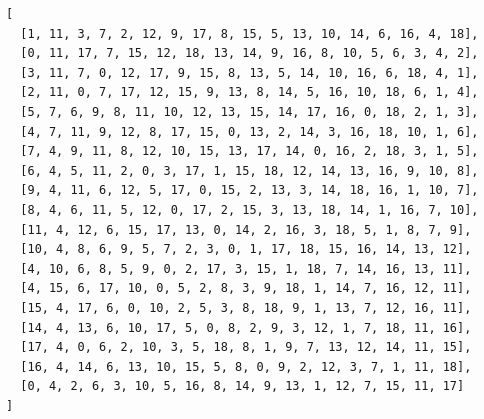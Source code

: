 \begin{verbatim}
[
  [1, 11, 3, 7, 2, 12, 9, 17, 8, 15, 5, 13, 10, 14, 6, 16, 4, 18],
  [0, 11, 17, 7, 15, 12, 18, 13, 14, 9, 16, 8, 10, 5, 6, 3, 4, 2],
  [3, 11, 7, 0, 12, 17, 9, 15, 8, 13, 5, 14, 10, 16, 6, 18, 4, 1],
  [2, 11, 0, 7, 17, 12, 15, 9, 13, 8, 14, 5, 16, 10, 18, 6, 1, 4],
  [5, 7, 6, 9, 8, 11, 10, 12, 13, 15, 14, 17, 16, 0, 18, 2, 1, 3],
  [4, 7, 11, 9, 12, 8, 17, 15, 0, 13, 2, 14, 3, 16, 18, 10, 1, 6],
  [7, 4, 9, 11, 8, 12, 10, 15, 13, 17, 14, 0, 16, 2, 18, 3, 1, 5],
  [6, 4, 5, 11, 2, 0, 3, 17, 1, 15, 18, 12, 14, 13, 16, 9, 10, 8],
  [9, 4, 11, 6, 12, 5, 17, 0, 15, 2, 13, 3, 14, 18, 16, 1, 10, 7],
  [8, 4, 6, 11, 5, 12, 0, 17, 2, 15, 3, 13, 18, 14, 1, 16, 7, 10],
  [11, 4, 12, 6, 15, 17, 13, 0, 14, 2, 16, 3, 18, 5, 1, 8, 7, 9],
  [10, 4, 8, 6, 9, 5, 7, 2, 3, 0, 1, 17, 18, 15, 16, 14, 13, 12],
  [4, 10, 6, 8, 5, 9, 0, 2, 17, 3, 15, 1, 18, 7, 14, 16, 13, 11],
  [4, 15, 6, 17, 10, 0, 5, 2, 8, 3, 9, 18, 1, 14, 7, 16, 12, 11],
  [15, 4, 17, 6, 0, 10, 2, 5, 3, 8, 18, 9, 1, 13, 7, 12, 16, 11],
  [14, 4, 13, 6, 10, 17, 5, 0, 8, 2, 9, 3, 12, 1, 7, 18, 11, 16],
  [17, 4, 0, 6, 2, 10, 3, 5, 18, 8, 1, 9, 7, 13, 12, 14, 11, 15],
  [16, 4, 14, 6, 13, 10, 15, 5, 8, 0, 9, 2, 12, 3, 7, 1, 11, 18],
  [0, 4, 2, 6, 3, 10, 5, 16, 8, 14, 9, 13, 1, 12, 7, 15, 11, 17]
]
\end{verbatim}
